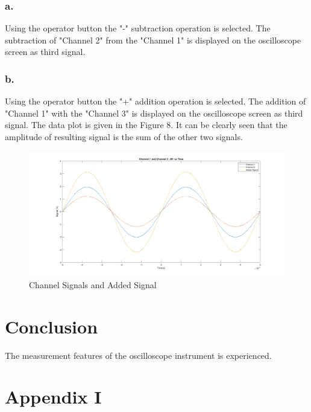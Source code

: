 \documentclass[letterpaper,12pt]{article}
\begin{document}
\subsubsection{a.}
 Using the operator button the "-" subtraction operation is selected. The subtraction of "Channel 2" from the "Channel 1" is displayed on the oscilloscope screen as third signal. 
\subsubsection{b.}
Using the operator button the "+" addition operation is selected. The addition of "Channel 1" with the "Channel 3" is displayed on the oscilloscope screen as third signal. The data plot is given in the Figure 8. It can be clearly seen that the amplitude of resulting signal is the sum of the other two signals. 
\begin{figure}[h]
	\caption{ Channel Signals and Added Signal  }
	\centering
	\includegraphics[width=1\textwidth]{9b.png}
\end{figure}


\section{Conclusion}
The measurement features of the oscilloscope instrument is experienced.
\section{Appendix I}


\begin{thebibliography}{99}


\end{thebibliography}
\end{document}
